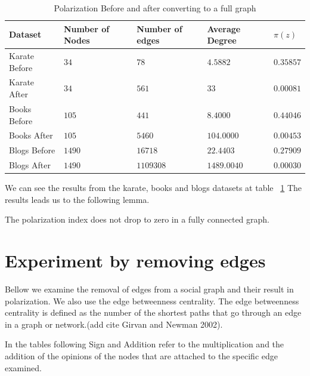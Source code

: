 \begin{table}[!htbp]
 \centering
 \caption{Polarization Before and after converting to a full graph}
 \label{tab:fullgraph}
 \begin{tabular}{| l || l | l | l | l |}
 \hline
  Dataset & Number of Nodes & Number of edges & Average Degree & $\pi(z)$\\
  \hline
  \hline
  Karate Before & $34$ & $78$ & $4.5882$ &  $0.35857$\\
  \hline
  Karate After & $34$ & $561$ & $33$ &  $0.00081$\\
  \hline
  \hline
  Books Before & $105$ & $441$ & $8.4000$ &  $0.44046$\\
  \hline
  Books After & $105$ & $5460$ & $104.0000$ &  $0.00453$\\
  \hline
  \hline
  Blogs Before & $1490$ & $16718$ & $22.4403$ &  $0.27909$\\
  \hline
  Blogs After & $1490$ & $1109308$ & $1489.0040$ &  $0.00030$\\
  \hline
 \end{tabular}
 \end{table}

\vspace{20pt}
We can see the results from the karate, books and blogs datasets at table ~\ref{tab:fullgraph} The results leads us to the following lemma.
\\	
\begin{lemma}
The polarization index does not drop to zero in a fully connected graph.
\end{lemma}



\section{Experiment by removing edges}
\label{sec:properties}
Bellow we examine the removal of edges from a social graph and their result in polarization. We also use the edge betweenness centrality. The edge betweenness centrality is defined as the number of the shortest paths that go through an edge in a graph or network.(add cite Girvan and Newman 2002). 

In the tables following Sign and Addition refer to the multiplication and the addition of the opinions of the nodes that are attached to the specific edge examined. 
\\

